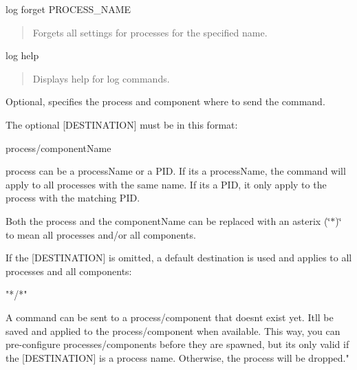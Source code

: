 \begin{DoxyVerb}log forget PROCESS_NAME\end{DoxyVerb}
 \begin{quote}
Forgets all settings for processes for the specified name. \end{quote}


\begin{DoxyVerb}log help \end{DoxyVerb}
 \begin{quote}
Displays help for log commands. \end{quote}


\begin{DoxyVerb}[DESTINATION] \end{DoxyVerb}


 Optional, specifies the process and component where to send the command.

The optional {\ttfamily }\mbox{[}D\+E\+S\+T\+I\+N\+A\+T\+I\+O\+N\mbox{]} must be in this format\+:

\begin{DoxyVerb}process/componentName \end{DoxyVerb}


\textquotesingle{}process\textquotesingle{} can be a process\+Name or a P\+I\+D. If it\textquotesingle{}s a process\+Name, the command will apply to all processes with the same name. If it\textquotesingle{}s a P\+I\+D, it only apply to the process with the matching P\+I\+D. ~\newline


Both the \textquotesingle{}process\textquotesingle{} and the \textquotesingle{}component\+Name\textquotesingle{} can be replaced with an asterix (\char`\"{}$\ast$)\char`\"{} to mean all processes and/or all components.

If the {\ttfamily }\mbox{[}D\+E\+S\+T\+I\+N\+A\+T\+I\+O\+N\mbox{]} is omitted, a default destination is used and applies to all processes and all components\+: \begin{DoxyVerb}"*/*" \end{DoxyVerb}


A command can be sent to a process/component that doesn\textquotesingle{}t exist yet. It\textquotesingle{}ll be saved and applied to the process/component when available. This way, you can pre-\/configure processes/components before they are spawned, but it\textquotesingle{}s only valid if the \mbox{[}D\+E\+S\+T\+I\+N\+A\+T\+I\+O\+N\mbox{]} is a process name. Otherwise, the \textquotesingle{}process\textquotesingle{} will be dropped."



